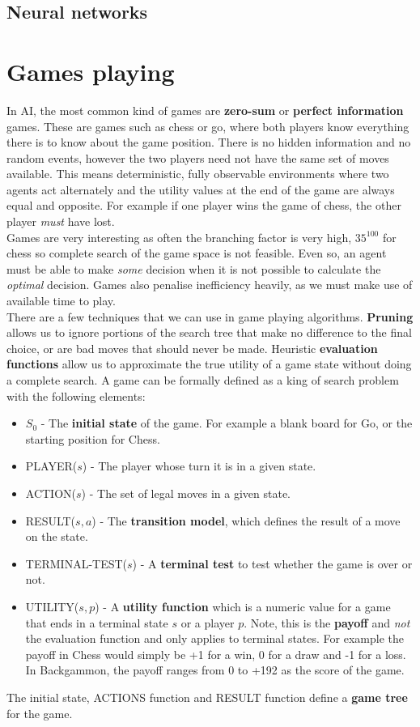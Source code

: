\documentclass{article}
\newcommand{\n}[0]{\\[\baselineskip]}
\begin{document}
\subsection{Neural networks}

\section{Games playing}
In AI, the most common kind of games are \textbf{zero-sum} or \textbf{perfect information} games. These are games such as chess or go, where both players know everything there is to know about the game position. There is no hidden information and no random events, however the two players need not have the same set of moves available. This means deterministic, fully observable environments where two agents act alternately and the utility values at the end of the game are always equal and opposite. For example if one player wins the game of chess, the other player \textit{must} have lost.
\n
Games are very interesting as often the branching factor is very high, $35^{100}$ for chess so complete search of the game space is not feasible. Even so, an agent must be able to make \textit{some} decision when it is not possible to calculate the \textit{optimal} decision. Games also penalise inefficiency heavily, as we must make use of available time to play.
\n
There are a few techniques that we can use in game playing algorithms. \textbf{Pruning} allows us to ignore portions of the search tree that make no difference to the final choice, or are bad moves that should never be made. Heuristic \textbf{evaluation functions} allow us to approximate the true utility of a game state without doing a complete search. A game can be formally defined as a king of search problem with the following elements:
\begin{itemize}
\item \textsc{$S_{0}$} - The \textbf{initial state} of the game. For example a blank board for Go, or the starting position for Chess.
\item \textsc{PLAYER($s$)} - The player whose turn it is in a given state.
\item \textsc{ACTION($s$)} - The set of legal moves in a given state.
\item \textsc{RESULT($s, a$)} - The \textbf{transition model}, which defines the result of a move on the state.
\item \textsc{TERMINAL-TEST($s$)} - A \textbf{terminal test} to test whether the game is over or not.
\item \textsc{UTILITY($s, p$)} - A \textbf{utility function} which is a numeric value for a game that ends in a terminal state $s$ or a player $p$. Note, this is the \textbf{payoff} and \textit{not} the evaluation function and only applies to terminal states. For example the payoff in Chess would simply be +1 for a win, 0 for a draw and -1 for a loss. In Backgammon, the payoff ranges from 0 to +192 as the score of the game.
\end{itemize}
The initial state, \textsc{ACTIONS} function and \textsc{RESULT} function define a \textbf{game tree} for the game. 
\end{document}
